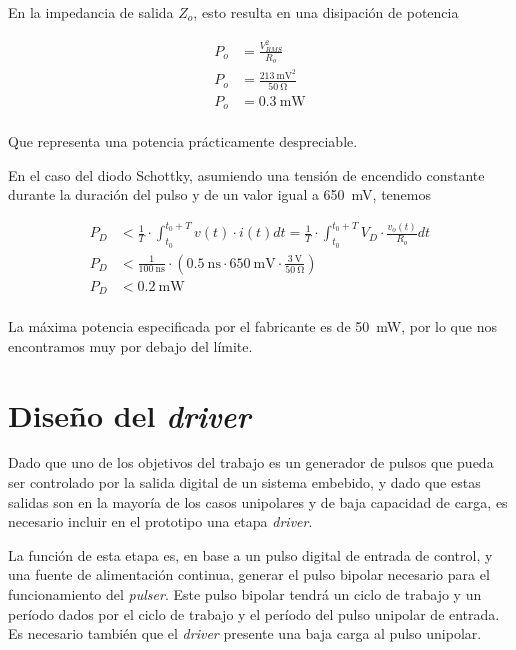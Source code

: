 En la impedancia de salida $Z_o$, esto resulta en una disipación de potencia

\begin{equation}
    \begin{aligned}
        P_{o} &= \frac{V_{RMS}^2}{R_o} \\
        P_{o} &= \frac{ \qty{213}{\milli\volt}^2}{ \qty{50}{\ohm}} \\
        P_{o} &= \qty{0.3}{\milli\watt} \\
    \end{aligned}
\end{equation}

Que representa una potencia prácticamente despreciable.

En el caso del diodo Schottky, asumiendo una tensión de encendido constante
durante la duración del pulso y de un valor igual a \qty{650}{\milli\volt},
tenemos

\begin{equation}
    \begin{aligned}
        P_{D} &< \frac{1}{T} \cdot \int_{t_0}^{t_0+T} v(t) \cdot i(t) dt =
        \frac{1}{T} \cdot \int_{t_0}^{t_0+T} V_D \cdot \frac{v_o(t)}{R_o} dt \\
        P_{D} &< \frac{1}{\qty{100}{\nano\second}} \cdot \left( \qty{0.5}{\nano\second} \cdot
        \qty{650}{\milli\volt} \cdot \frac{\qty{3}{\volt}}{
            \qty{50}{\ohm}} \right) \\
        P_{D} &< \qty{0.2}{\milli\watt} \\
    \end{aligned}
\end{equation}

La máxima potencia especificada por el fabricante es de \qty{50}{\milli\watt},
por lo que nos encontramos muy por debajo del límite.

\section{Diseño del \textit{driver}}

Dado que uno de los objetivos del trabajo es un generador de pulsos que pueda
ser controlado por la salida digital de un sistema embebido, y dado que estas
salidas son en la mayoría de los casos unipolares y de baja capacidad de carga,
es necesario incluir en el prototipo una etapa \textit{driver}.

La función de esta etapa es, en base a un pulso digital de entrada de control, y
una fuente de alimentación continua, generar el pulso bipolar necesario para el
funcionamiento del \textit{pulser}. Este pulso bipolar tendrá un ciclo de
trabajo y un período dados por el ciclo de trabajo y el período del pulso
unipolar de entrada. Es necesario también que el \textit{driver} presente una
baja carga al pulso unipolar.

